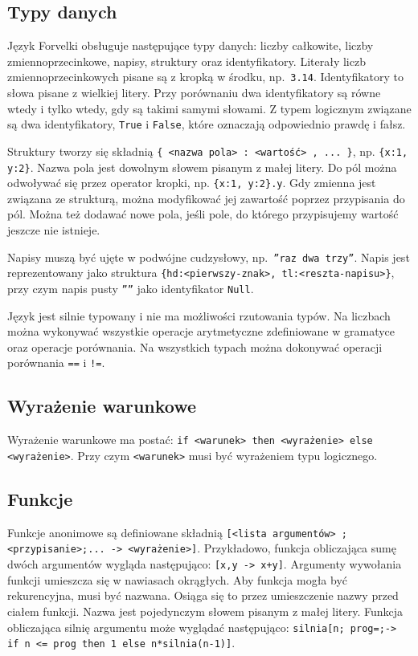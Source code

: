 \documentclass[4paper,10pt]{article}
\begin{document}
\subsection{Typy danych}
Język Forvelki obsługuje następujące typy danych: liczby całkowite, liczby zmiennoprzecinkowe, napisy, struktury oraz identyfikatory.
Literały liczb zmiennoprzecinkowych pisane są z kropką w środku, np.~\texttt{3.14}.
Identyfikatory to słowa pisane z wielkiej litery.
Przy porównaniu dwa identyfikatory są równe wtedy i tylko wtedy, gdy są takimi samymi słowami.
Z typem logicznym związane są dwa identyfikatory, \texttt{True} i \texttt{False}, które oznaczają odpowiednio prawdę i fałsz.

Struktury tworzy się składnią \texttt{\{ <nazwa pola> : <wartość> , ... \}}, np. \texttt{\{x:1, y:2\}}.
Nazwa pola jest dowolnym słowem pisanym z małej litery.
Do pól można odwoływać się przez operator kropki, np. \texttt{\{x:1,~y:2\}.y}.
Gdy zmienna jest związana ze strukturą, można modyfikować jej zawartość poprzez przypisania do pól.
Można też dodawać nowe pola, jeśli pole, do którego przypisujemy wartość jeszcze nie istnieje.

Napisy muszą być ujęte w podwójne cudzysłowy, np.~\texttt{''raz dwa trzy''}.
Napis jest reprezentowany jako struktura \texttt{\{hd:<pierwszy-znak>,~tl:<reszta-napisu>\}}, przy czym napis pusty \texttt{''''} jako identyfikator \texttt{Null}.

Język jest silnie typowany i nie ma możliwości rzutowania typów.
Na liczbach można wykonywać wszystkie operacje arytmetyczne zdefiniowane w gramatyce oraz operacje porównania.
Na wszystkich typach można dokonywać operacji porównania \texttt{==} i \texttt{!=}.

\subsection{Wyrażenie warunkowe}
Wyrażenie warunkowe ma postać:
\texttt{if <warunek> then <wyrażenie> else <wyrażenie>}.
Przy czym \texttt{<warunek>} musi być wyrażeniem typu logicznego.

\subsection{Funkcje}
Funkcje anonimowe są definiowane składnią \texttt{[<lista argumentów> ;<przypisanie>;... ->  <wyrażenie>]}.
Przykładowo, funkcja obliczająca sumę dwóch argumentów wygląda następująco: \texttt{[x,y~->~x+y]}.
Argumenty wywołania funkcji umieszcza się w nawiasach okrągłych.
Aby funkcja mogła być rekurencyjna, musi być nazwana.
Osiąga się to przez umieszczenie nazwy przed ciałem funkcji.
Nazwa jest pojedynczym słowem pisanym z małej litery.
Funkcja obliczająca silnię argumentu może wyglądać następująco: \texttt{silnia[n; prog=;->  if n <= prog then 1 else n*silnia(n-1)]}.
\end{document}
